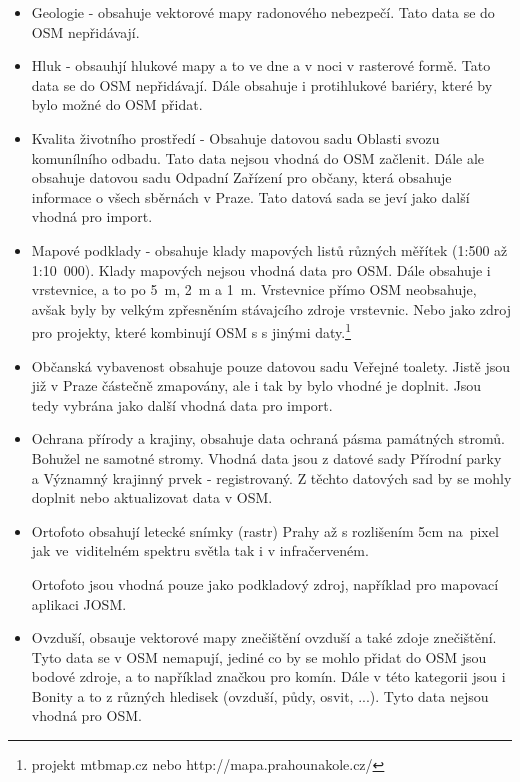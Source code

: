 \begin{itemize}
    \item   Geologie - obsahuje vektorové mapy radonového nebezpečí. Tato data
            se do OSM nepřidávají.

    \item   Hluk - obsauhjí hlukové mapy a to ve dne a v noci v rasterové formě.
            Tato data se do OSM nepřidávají. Dále obsahuje i protihlukové bariéry,
            které by bylo možné do OSM přidat.

    \item   Kvalita životního prostředí - Obsahuje datovou sadu Oblasti svozu
            komunílního odbadu.
            Tato data nejsou vhodná do OSM začlenit. Dále ale obsahuje datovou sadu
            Odpadní Zařízení pro občany, která obsahuje informace o všech sběrnách
            v Praze. Tato datová sada se jeví jako další vhodná pro import.

    \item   Mapové podklady - obsahuje klady mapových listů různých měřítek
            (1:500 až 1:10~000).
            Klady mapových nejsou vhodná data pro OSM. Dále obsahuje i vrstevnice,
            a to po 5~m, 2~m a 1~m. Vrstevnice přímo OSM neobsahuje, avšak byly by
            velkým zpřesněním stávajcího zdroje vrstevnic. Nebo jako zdroj pro
            projekty, které kombinují OSM s s jinými daty.\footnote{projekt mtbmap.cz nebo http://mapa.prahounakole.cz/}

    \item   Občanská vybavenost obsahuje pouze datovou sadu Veřejné toalety.
            Jistě jsou již v Praze částečně zmapovány, ale i tak by bylo vhodné
            je doplnit. Jsou tedy vybrána jako další vhodná data pro import.

    \item   Ochrana přírody a krajiny, obsahuje data ochraná pásma památných stromů.
            Bohužel ne samotné stromy. Vhodná data jsou z datové sady Přírodní parky a
            Významný krajinný prvek - registrovaný. Z těchto datových sad by se mohly
            doplnit nebo aktualizovat data v OSM.

    \item   Ortofoto obsahují letecké snímky (rastr) Prahy až s rozlišením 5cm
            na~pixel jak ve~viditelném spektru světla tak i v infračerveném.

            Ortofoto jsou vhodná pouze jako podkladový zdroj,
            například pro mapovací aplikaci JOSM.

    \item   Ovzduší, obsauje vektorové mapy znečištění ovzduší a také
            zdoje znečištění. Tyto data se v OSM nemapují, jediné co by se
            mohlo přidat do OSM jsou bodové zdroje, a to například značkou pro komín.
            Dále v této kategorii jsou i Bonity a to z různých hledisek (ovzduší,
            půdy, osvit, ...). Tyto data nejsou vhodná pro OSM.


\end{itemize}
